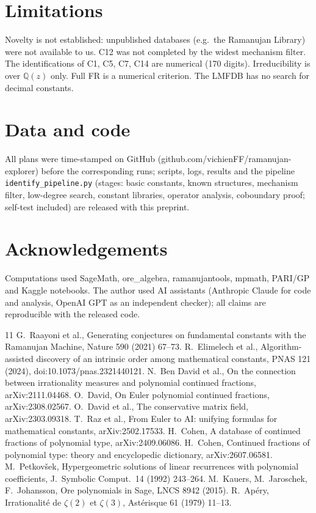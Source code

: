 \documentclass[11pt]{article}
\begin{document}
\section{Limitations}
Novelty is not established: unpublished databases (e.g.\ the Ramanujan Library) were not available to us. C12 was not completed
by the widest mechanism filter. The identifications of C1, C5, C7, C14 are numerical (170 digits). Irreducibility is over
$\mathbb Q(z)$ only. Full FR is a numerical criterion. The LMFDB has no search for decimal constants.

\section*{Data and code}
All plans were time-stamped on GitHub (github.com/vichienFF/ramanujan-explorer) before the corresponding runs; scripts, logs,
results and the pipeline \texttt{identify\_pipeline.py} (stages: basic constants, known structures, mechanism filter, low-degree
search, constant libraries, operator analysis, coboundary proof; self-test included) are released with this preprint.
\section*{Acknowledgements}
Computations used SageMath, ore\_algebra, ramanujantools, mpmath, PARI/GP and Kaggle notebooks. The author used AI assistants
(Anthropic Claude for code and analysis, OpenAI GPT as an independent checker); all claims are reproducible with the released code.

\begin{thebibliography}{11}
 G.~Raayoni et al., Generating conjectures on fundamental constants with the Ramanujan Machine, Nature 590 (2021) 67--73.
 R.~Elimelech et al., Algorithm-assisted discovery of an intrinsic order among mathematical constants, PNAS 121 (2024), doi:10.1073/pnas.2321440121.
 N.~Ben David et al., On the connection between irrationality measures and polynomial continued fractions, arXiv:2111.04468.
 O.~David, On Euler polynomial continued fractions, arXiv:2308.02567.
 O.~David et al., The conservative matrix field, arXiv:2303.09318.
 T.~Raz et al., From Euler to AI: unifying formulas for mathematical constants, arXiv:2502.17533.
 H.~Cohen, A database of continued fractions of polynomial type, arXiv:2409.06086.
 H.~Cohen, Continued fractions of polynomial type: theory and encyclopedic dictionary, arXiv:2607.06581.
 M.~Petkov\v sek, Hypergeometric solutions of linear recurrences with polynomial coefficients, J.\ Symbolic Comput.\ 14 (1992) 243--264.
 M.~Kauers, M.~Jaroschek, F.~Johansson, Ore polynomials in Sage, LNCS 8942 (2015).
 R.~Ap\'ery, Irrationalit\'e de $\zeta(2)$ et $\zeta(3)$, Ast\'erisque 61 (1979) 11--13.
\end{thebibliography}
\end{document}

